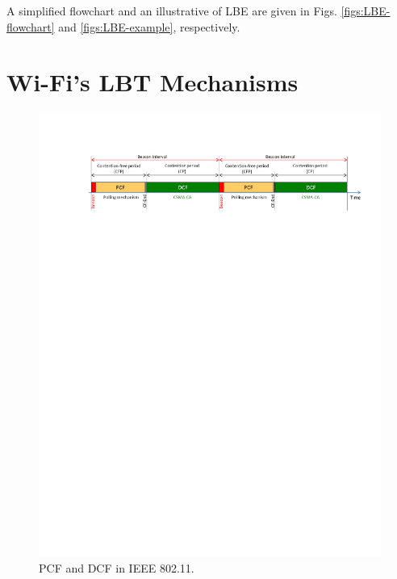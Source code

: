 A simplified flowchart and an illustrative of LBE are given in Figs. \ref{figs:LBE-flowchart} and \ref{figs:LBE-example}, respectively.

\section{Wi-Fi's LBT Mechanisms}
\label{wifi-lbt}
\begin{figure}[!t]
	\centering
	\includegraphics[width=1.0\columnwidth]{figures2/802-11-PCF-DCF}
	\caption{PCF and DCF in IEEE 802.11.}
	\label{figs:802-11-PCF-DCF}
\end{figure}

